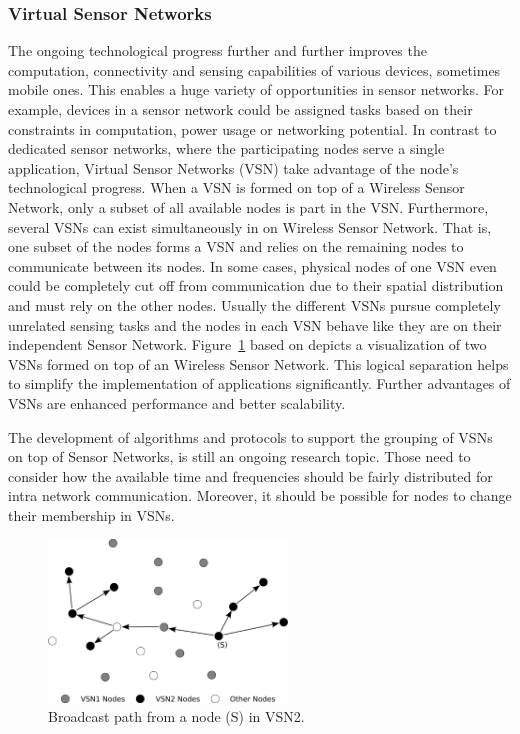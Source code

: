 \documentclass[12pt,journal]{IEEEtran}
\begin{document}
\subsubsection{Virtual Sensor Networks}
The ongoing technological progress further and further improves the computation, connectivity and sensing capabilities of various devices, sometimes mobile ones. \cite{Jayasumana} This enables a huge variety of opportunities in sensor networks. For example, devices in a sensor network could be assigned tasks based on their constraints in computation, power usage or networking potential. In contrast to dedicated sensor networks, where the participating nodes serve a single application, Virtual Sensor Networks (VSN) take advantage of the node’s technological progress. When a VSN is formed on top of a Wireless Sensor Network, only a subset of all available nodes is part in the VSN. Furthermore, several VSNs can exist simultaneously in on Wireless Sensor Network. \cite{Jayasumana} That is, one subset of the nodes forms a VSN and relies on the remaining nodes to communicate between its nodes. In some cases, physical nodes of one VSN even could be completely cut off from communication due to their spatial distribution and must rely on the other nodes. Usually the different VSNs pursue completely unrelated sensing tasks and the nodes in each VSN behave like they are on their independent Sensor Network. Figure~\ref{vsnfig} based on \cite{Jayasumana} depicts a visualization of two VSNs formed on top of an Wireless Sensor Network. This logical separation helps to simplify the implementation of applications significantly. \cite{Jayasumana} Further advantages of VSNs are enhanced performance and better scalability.

The development of algorithms and protocols to support the grouping of VSNs on top of Sensor Networks, is still an ongoing research topic. Those need to consider how the available time and frequencies should be fairly distributed for intra network communication. Moreover, it should be possible for nodes to change their membership in VSNs.

\begin{figure}
 \centering
 \includegraphics[width=2.5in]{figs/VirtualSensorNetwork.pdf}
 \caption{Broadcast path from a node (S) in VSN2.}
 \label{vsnfig}
\end{figure}
\end{document}
